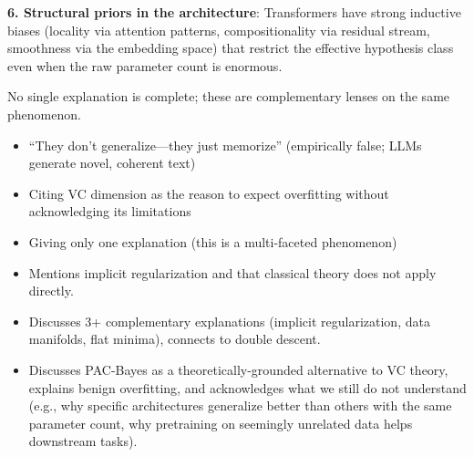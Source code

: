 \begin{interviewq}
\textbf{6. Structural priors in the architecture}: Transformers have strong inductive biases (locality via attention patterns, compositionality via residual stream, smoothness via the embedding space) that restrict the effective hypothesis class even when the raw parameter count is enormous.

No single explanation is complete; these are complementary lenses on the same phenomenon.

\redflags
\begin{itemize}
    \item ``They don't generalize---they just memorize'' (empirically false; LLMs generate novel, coherent text)
    \item Citing VC dimension as the reason to expect overfitting without acknowledging its limitations
    \item Giving only one explanation (this is a multi-faceted phenomenon)
\end{itemize}


\goodgreat
\begin{itemize}
    \item {} Mentions implicit regularization and that classical theory does not apply directly.
    \item {} Discusses 3+ complementary explanations (implicit regularization, data manifolds, flat minima), connects to double descent.
    \item {} Discusses PAC-Bayes as a theoretically-grounded alternative to VC theory, explains benign overfitting, and acknowledges what we still do not understand (e.g., why specific architectures generalize better than others with the same parameter count, why pretraining on seemingly unrelated data helps downstream tasks).
\end{itemize}

\end{interviewq}
